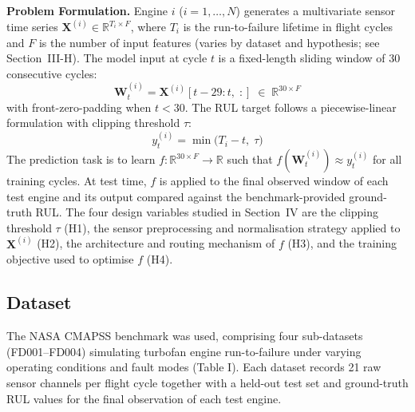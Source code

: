 \documentclass[review,12pt]{elsarticle}
\begin{document}
\noindent\textbf{Problem Formulation.} Engine $i$ ($i = 1, \ldots, N$) generates a multivariate sensor time series $\mathbf{X}^{(i)} \in \mathbb{R}^{T_i \times F}$, where $T_i$ is the run-to-failure lifetime in flight cycles and $F$ is the number of input features (varies by dataset and hypothesis; see Section~III-H). The model input at cycle $t$ is a fixed-length sliding window of 30 consecutive cycles:
\begin{equation}
  \mathbf{W}_t^{(i)} = \mathbf{X}^{(i)}[t{-}29:t,\;:] \;\in\; \mathbb{R}^{30 \times F}
  \label{eq:window}
\end{equation}
with front-zero-padding when $t < 30$. The RUL target follows a piecewise-linear formulation with clipping threshold $\tau$:
\begin{equation}
  y_t^{(i)} = \min\!\bigl(T_i - t,\;\tau\bigr)
  \label{eq:rul}
\end{equation}
The prediction task is to learn $f : \mathbb{R}^{30 \times F} \to \mathbb{R}$ such that $f(\mathbf{W}_t^{(i)}) \approx y_t^{(i)}$ for all training cycles. At test time, $f$ is applied to the final observed window of each test engine and its output compared against the benchmark-provided ground-truth RUL. The four design variables studied in Section~IV are the clipping threshold $\tau$ (H1), the sensor preprocessing and normalisation strategy applied to $\mathbf{X}^{(i)}$ (H2), the architecture and routing mechanism of $f$ (H3), and the training objective used to optimise $f$ (H4).

\subsection{Dataset}

The NASA CMAPSS benchmark was used, comprising four sub-datasets (FD001–FD004) simulating turbofan engine run-to-failure under varying operating conditions and fault modes (Table I). Each dataset records 21 raw sensor channels per flight cycle together with a held-out test set and ground-truth RUL values for the final observation of each test engine.

\begin{table}[!t]
\centering
\small
\caption{CMAPSS sub-dataset characteristics}
\label{tab:i}
\end{table}
\end{document}
